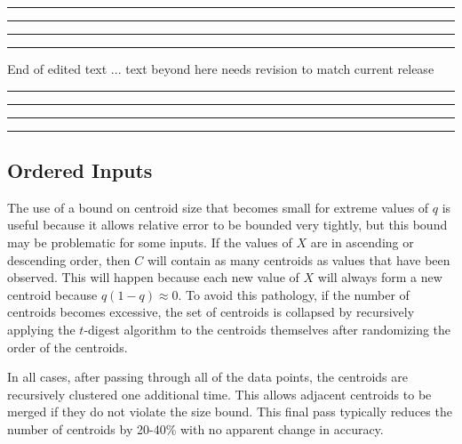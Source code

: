 \documentclass[11pt]{amsart}
\begin{document}
\vspace{10mm}
\hrule
\vspace{0.4mm}
\hrule
\vspace{.6mm}
\hrule
\vspace{1mm}
\hrule
End of edited text ... text beyond here needs revision to match current release
\hrule
\vspace{1mm}
\hrule
\vspace{0.6mm}
\hrule
\vspace{0.4mm}
\hrule
\vspace{10mm}

\subsection{Ordered Inputs}
The use of a bound on centroid size that becomes small for extreme values of $q$ is useful because it allows relative error to be bounded very tightly, but this bound may be problematic for some inputs.  If the values of $X$ are in ascending or descending order, then $C$ will contain as many centroids as values that have been observed.  This will happen because each new value of $X$ will always form a new centroid because $q(1-q)\approx0$.  To avoid this pathology, if the number of centroids becomes excessive, the set of centroids is collapsed by recursively applying the $t$-digest algorithm to the centroids themselves after randomizing the order of the centroids.  

In all cases, after passing through all of the data points, the centroids are recursively clustered one additional time.  This allows adjacent centroids to be merged if they do not violate the size bound.  This final pass typically reduces the number of centroids by 20-40\% with no apparent change in accuracy.
\end{document}
